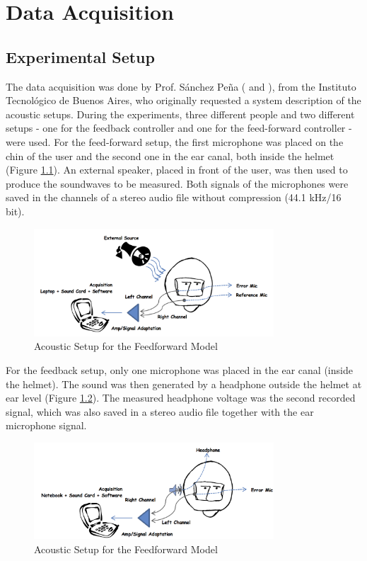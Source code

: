 \chapter{Data Acquisition}\label{chap: dataaq}
\section{Experimental Setup}
The data acquisition was done by Prof. S\'{a}nchez Pe\~{n}a (\cite{castae2010active} and \cite{violini2014}), from the Instituto Tecnol\'{o}gico de Buenos Aires, who originally requested a system description of the acoustic setups. During the experiments, three different people and two different setups - one for the feedback controller and one for the feed-forward controller - were used. For the feed-forward setup, the first microphone was placed on the chin of the user and the second one in the ear canal, both inside the helmet (Figure \ref{fig:setupff}). An external speaker, placed in front of the user, was then used to produce the soundwaves to be measured. Both signals of the microphones were saved in the channels of a stereo audio file without compression (44.1 kHz/16 bit).\\

\begin{figure}[h]
\centering
\includegraphics[width=0.8\textwidth]{pics/setupff}
\caption{Acoustic Setup for the Feedforward Model}
\label{fig:setupff}
\end{figure}

For the feedback setup, only one microphone was placed in the ear canal (inside the helmet). The sound was then generated by a headphone outside the helmet at ear level (Figure \ref{fig:setupfb}). The measured headphone voltage was the second recorded signal, which was also saved in a stereo audio file together with the ear microphone signal.

\begin{figure}[h]
\centering
\includegraphics[width=0.8\textwidth]{pics/setupfb}
\caption{Acoustic Setup for the Feedforward Model}
\label{fig:setupfb}
\end{figure}

